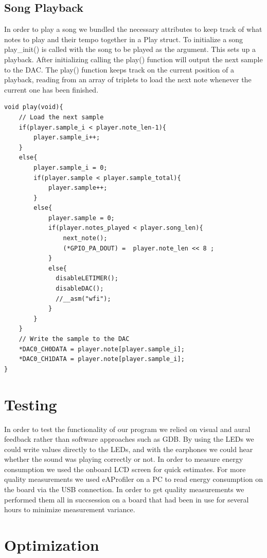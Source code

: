 \subsection{Song Playback}
In order to play a song we bundled the necessary attributes to keep track of what notes to play and their tempo together in a Play struct. To initialize a song play\_init() is called with the song to be played as the argument. This sets up a playback. After initializing calling the play() function will output the next sample to the DAC.
The play() function keeps track on the current position of a playback, reading from an array of triplets to load the next note whenever the current one has been finished.

\begin{minipage}{\textwidth}
\begin{lstlisting}
void play(void){
	// Load the next sample
	if(player.sample_i < player.note_len-1){			
		player.sample_i++;								
	}
	else{								
		player.sample_i = 0;
		if(player.sample < player.sample_total){
   			player.sample++;				
		}
		else{							
			player.sample = 0;
			if(player.notes_played < player.song_len){
				next_note();
				(*GPIO_PA_DOUT) =  player.note_len << 8 ;		
			}			 
			else{
			  disableLETIMER();
			  disableDAC();
			  //__asm("wfi");
			}
		}
	}
	// Write the sample to the DAC
	*DAC0_CH0DATA = player.note[player.sample_i];
	*DAC0_CH1DATA = player.note[player.sample_i];
}
\end{lstlisting}
\end{minipage}



\section{Testing}
In order to test the functionality of our program we relied on visual and aural feedback rather than software approaches such as GDB. By using the LEDs we could write values directly to the LEDs, and with the earphones we could hear whether the sound was playing correctly or not. In order to measure energy consumption we used the onboard LCD screen for quick estimates. For more quality measurements we used eAProfiler on a PC to read energy consumption on the board via the USB connection. In order to get quality measurements we performed them all in succsession on a board that had been in use for several hours to minimize measurement variance. 

\section{Optimization}

